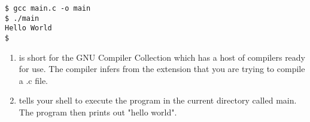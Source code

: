\begin{verbatim}
$ gcc main.c -o main
$ ./main
Hello World
$
\end{verbatim}

\begin{enumerate}
	\item {} is short for the GNU Compiler Collection which has a host of compilers ready for use. The compiler infers from the extension that you are trying to compile a .c file.
	\item {} tells your shell to execute the program in the current directory called main. The program then prints out "hello world".
\end{enumerate}


